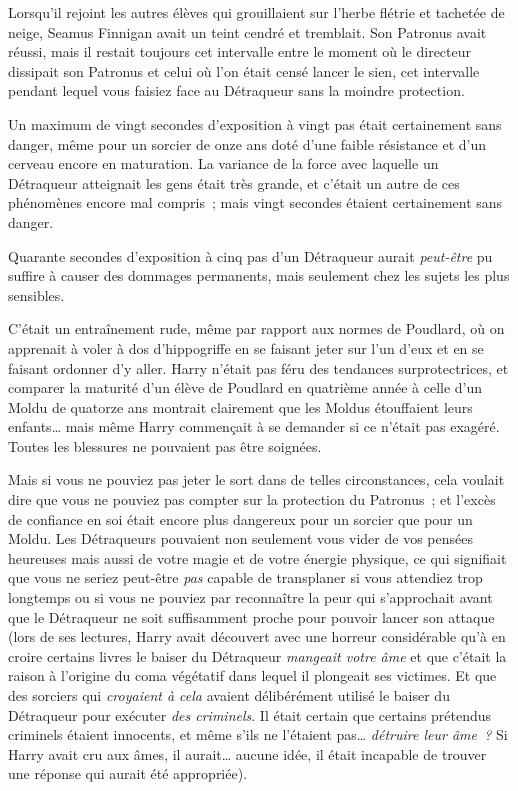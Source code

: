 Lorsqu'il rejoint les autres élèves qui grouillaient sur l'herbe flétrie et tachetée de neige, Seamus Finnigan avait un teint cendré et tremblait. Son Patronus avait réussi, mais il restait toujours cet intervalle entre le moment où le directeur dissipait son Patronus et celui où l'on était censé lancer le sien, cet intervalle pendant lequel vous faisiez face au Détraqueur sans la moindre protection.

Un maximum de vingt secondes d'exposition à vingt pas était certainement sans danger, même pour un sorcier de onze ans doté d'une faible résistance et d'un cerveau encore en maturation. La variance de la force avec laquelle un Détraqueur atteignait les gens était très grande, et c'était un autre de ces phénomènes encore mal compris~; mais vingt secondes étaient certainement sans danger.

Quarante secondes d'exposition à cinq pas d'un Détraqueur aurait \emph{peut-être} pu suffire à causer des dommages permanents, mais seulement chez les sujets les plus sensibles.

C'était un entraînement rude, même par rapport aux normes de Poudlard, où on apprenait à voler à dos d'hippogriffe en se faisant jeter sur l'un d'eux et en se faisant ordonner d'y aller. Harry n'était pas féru des tendances surprotectrices, et comparer la maturité d'un élève de Poudlard en quatrième année à celle d'un Moldu de quatorze ans montrait clairement que les Moldus étouffaient leurs enfants… mais même Harry commençait à se demander si ce n'était pas exagéré. Toutes les blessures ne pouvaient pas être soignées.

Mais si vous ne pouviez pas jeter le sort dans de telles circonstances, cela voulait dire que vous ne pouviez pas compter sur la protection du Patronus~; et l'excès de confiance en soi était encore plus dangereux pour un sorcier que pour un Moldu. Les Détraqueurs pouvaient non seulement vous vider de vos pensées heureuses mais aussi de votre magie et de votre énergie physique, ce qui signifiait que vous ne seriez peut-être \emph{pas} capable de transplaner si vous attendiez trop longtemps ou si vous ne pouviez par reconnaître la peur qui s'approchait avant que le Détraqueur ne soit suffisamment proche pour pouvoir lancer son attaque (lors de ses lectures, Harry avait découvert avec une horreur considérable qu'à en croire certains livres le baiser du Détraqueur \emph{mangeait votre âme} et que c'était la raison à l'origine du coma végétatif dans lequel il plongeait ses victimes. Et que des sorciers qui \emph{croyaient à cela} avaient délibérément utilisé le baiser du Détraqueur pour exécuter \emph{des criminels}. Il était certain que certains prétendus criminels étaient innocents, et même s'ils ne l'étaient pas… \emph{détruire leur âme~?} Si Harry avait cru aux âmes, il aurait… aucune idée, il était incapable de trouver une réponse qui aurait été appropriée).

